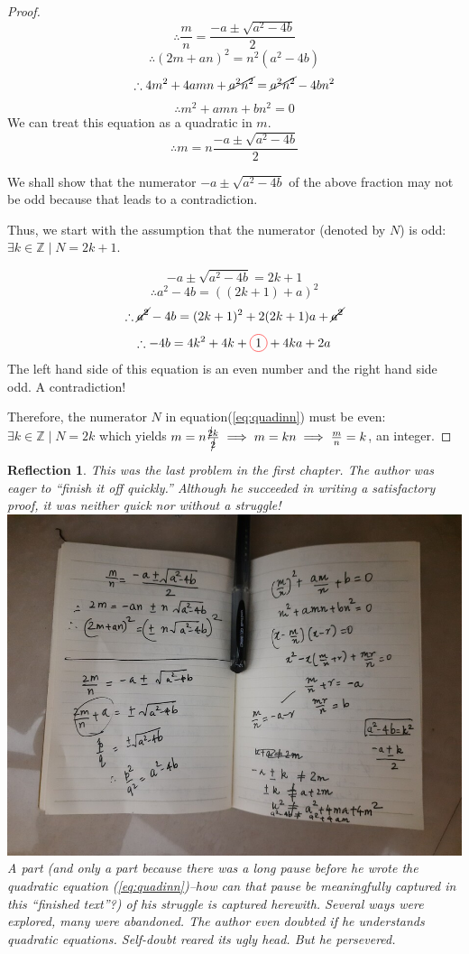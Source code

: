 \documentclass[english,notitlepage,smartquotes]{hgbreport}
\theoremstyle{definition}
\theoremstyle{remark}
\theoremstyle{plain}
\newtheorem{reflection}{Reflection}
\newcommand*\circled[1]{\tikz[baseline=(char.base)]{
    \node[shape=circle,draw=red,inner sep=2pt] (char) {#1};}}
\begin{document}
\begin{enumerate}[label=\textbf{\arabic*}.]
\begin{enumerate}
\begin{proof}
$$
\therefore \frac{m}{n}=\frac{-a\pm\sqrt{a^2-4b}}{2}
$$
$$
\therefore(2m+an)^2=n^2(a^2-4b)
$$
$$
\therefore 4m^2+4amn+\cancel{a^2n^2}=\cancel{a^2n^2}-4bn^2
$$
$$
\therefore m^2+amn+bn^2=0
$$
We can treat this equation as a quadratic in $m$.
\begin{equation}
\label{eq:quadinn}
\therefore m=n\frac{-a\pm{\sqrt{a^2-4b}}}{2}
\end{equation}

We shall show that the numerator $-a\pm{\sqrt{a^2-4b}}$ of the above fraction may not be odd because that leads to a contradiction.

Thus, we start with the assumption that the numerator (denoted by $N$) is odd: $\exists k\in\mathbb{Z}\mid N=2k+1$.

$$
-a\pm{\sqrt{a^2-4b}}=2k+1
$$
$$
\therefore a^2-4b=((2k+1)+a)^2
$$
$$
\therefore \cancel{a^2}-4b=(2k+1)^2+2(2k+1)a+\cancel{a^2}
$$
$$
\therefore-4b=4k^2+4k+\circled{1}+4ka+2a
$$
The left hand side of this equation is an even number and the right hand side odd. A contradiction!

Therefore, the numerator $N$ in equation(\ref{eq:quadinn}) must be even: $\exists k\in\mathbb{Z}\mid N=2k$ which yields $m=n\frac{\cancel{2}k}{\cancel{2}}\implies m=kn\implies \frac{m}{n}=k$, an integer.

\end{proof}
\begin{reflection}
This was the last problem in the first chapter. The author was eager to ``finish it off quickly.'' Although he succeeded in writing a satisfactory proof, it was neither quick nor without a struggle!
\includegraphics[scale=0.3]{struggle-1-s}
A part (and only a part because there was a long pause before he wrote the quadratic equation (\ref{eq:quadinn})--how can that pause be meaningfully captured in this ``finished text''?) of his struggle is captured herewith. Several ways were explored, many were abandoned. The author even doubted if he understands quadratic equations. Self-doubt reared its ugly head. But he persevered. 


\end{reflection}
\end{enumerate}
\end{enumerate}
\end{document}

